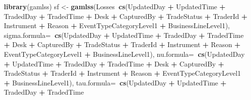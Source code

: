 \documentclass[]{DissertateUSU}
\newenvironment{Shaded}{\begin{snugshade}}{\end{snugshade}}
\newcommand{\KeywordTok}[1]{\textcolor[rgb]{0.13,0.29,0.53}{\textbf{#1}}}
\newcommand{\DataTypeTok}[1]{\textcolor[rgb]{0.13,0.29,0.53}{#1}}
\newcommand{\StringTok}[1]{\textcolor[rgb]{0.31,0.60,0.02}{#1}}
\newcommand{\OperatorTok}[1]{\textcolor[rgb]{0.81,0.36,0.00}{\textbf{#1}}}
\newcommand{\NormalTok}[1]{#1}
\begin{document}
\begin{Shaded}
\begin{Highlighting}[]
\KeywordTok{library}\NormalTok{(gamlss)}
\NormalTok{sf <-}\StringTok{ }\KeywordTok{gamlss}\NormalTok{(Losses}\OperatorTok{~}\KeywordTok{cs}\NormalTok{(UpdatedDay }\OperatorTok{+}\StringTok{ }\NormalTok{UpdatedTime }\OperatorTok{+}\StringTok{ }\NormalTok{TradedDay }\OperatorTok{+}
\StringTok{                }\NormalTok{TradedTime }\OperatorTok{+}\StringTok{ }\NormalTok{Desk }\OperatorTok{+}\StringTok{ }\NormalTok{CapturedBy }\OperatorTok{+}\StringTok{ }\NormalTok{TradeStatus }
               \OperatorTok{+}\StringTok{ }\NormalTok{TraderId }\OperatorTok{+}\StringTok{ }\NormalTok{Instrument }\OperatorTok{+}\StringTok{ }\NormalTok{Reason }\OperatorTok{+}\StringTok{ }
\StringTok{                 }\NormalTok{EventTypeCategoryLevel1 }\OperatorTok{+}\StringTok{ }\NormalTok{BusinessLineLevel1), }
\DataTypeTok{sigma.formula=}\OperatorTok{~}\KeywordTok{cs}\NormalTok{(UpdatedDay }\OperatorTok{+}\StringTok{ }\NormalTok{UpdatedTime }\OperatorTok{+}\StringTok{ }\NormalTok{TradedDay }\OperatorTok{+}\StringTok{ }
\StringTok{                }\NormalTok{TradedTime }\OperatorTok{+}\StringTok{ }\NormalTok{Desk }\OperatorTok{+}\StringTok{ }\NormalTok{CapturedBy }\OperatorTok{+}\StringTok{ }\NormalTok{TradeStatus }
               \OperatorTok{+}\StringTok{ }\NormalTok{TraderId }\OperatorTok{+}\StringTok{ }\NormalTok{Instrument }\OperatorTok{+}\StringTok{ }\NormalTok{Reason }\OperatorTok{+}\StringTok{ }
\StringTok{               }\NormalTok{EventTypeCategoryLevel1 }\OperatorTok{+}\StringTok{ }\NormalTok{BusinessLineLevel1),}
\DataTypeTok{nu.formula=}\OperatorTok{~}\KeywordTok{cs}\NormalTok{(UpdatedDay }\OperatorTok{+}\StringTok{ }\NormalTok{UpdatedTime }\OperatorTok{+}\StringTok{ }\NormalTok{TradedDay }\OperatorTok{+}\StringTok{ }\NormalTok{TradedTime}
               \OperatorTok{+}\StringTok{ }\NormalTok{Desk }\OperatorTok{+}\StringTok{ }\NormalTok{CapturedBy }\OperatorTok{+}\StringTok{ }\NormalTok{TradeStatus }\OperatorTok{+}\StringTok{ }\NormalTok{TraderId }\OperatorTok{+}\StringTok{ }
\StringTok{              }\NormalTok{Instrument }\OperatorTok{+}\StringTok{ }\NormalTok{Reason }\OperatorTok{+}\StringTok{ }\NormalTok{EventTypeCategoryLevel1 }\OperatorTok{+}\StringTok{ }
\StringTok{              }\NormalTok{BusinessLineLevel1),}
 \DataTypeTok{tau.formula=}\OperatorTok{~}\KeywordTok{cs}\NormalTok{(UpdatedDay }\OperatorTok{+}\StringTok{ }\NormalTok{UpdatedTime }\OperatorTok{+}\StringTok{ }\NormalTok{TradedDay }\OperatorTok{+}\StringTok{ }\NormalTok{TradedTime}

\end{Highlighting}
\end{Shaded}
\end{document}
